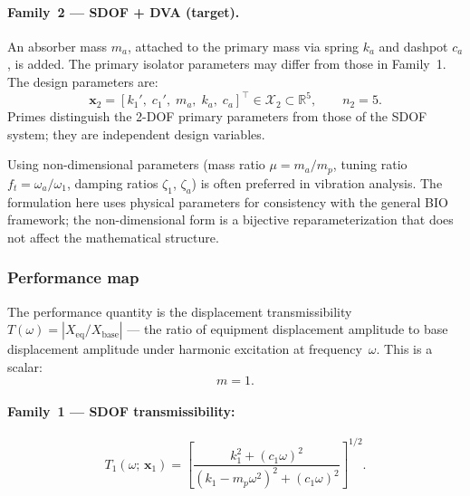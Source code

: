 \paragraph{Family~2 --- SDOF + DVA (target).}
An absorber mass $m_a$, attached to the primary mass via spring $k_a$ and dashpot $c_a$, is added. The primary isolator parameters may differ from those in Family~1. The design parameters are:
\begin{equation}
    \mathbf{x}_2 = [k_1',\; c_1',\; m_a,\; k_a,\; c_a]^\top \in \mathcal{X}_2 \subset \mathbb{R}^5, \qquad n_2 = 5.
    \label{eq:dva_params}
\end{equation}
Primes distinguish the 2-DOF primary parameters from those of the SDOF system; they are independent design variables.

\begin{remark}
Using non-dimensional parameters (mass ratio $\mu = m_a/m_p$, tuning ratio $f_t = \omega_a/\omega_1$, damping ratios $\zeta_1$, $\zeta_a$) is often preferred in vibration analysis. The formulation here uses physical parameters for consistency with the general BIO framework; the non-dimensional form is a bijective reparameterization that does not affect the mathematical structure.
\end{remark}


\subsubsection{Performance map}

The performance quantity is the displacement transmissibility $T(\omega) = |X_{\mathrm{eq}} / X_{\mathrm{base}}|$ --- the ratio of equipment displacement amplitude to base displacement amplitude under harmonic excitation at frequency~$\omega$. This is a scalar:
\begin{equation}
    m = 1.
\end{equation}

\paragraph{Family~1 --- SDOF transmissibility:}
\begin{equation}
    T_1(\omega;\, \mathbf{x}_1)
    = \left[ \frac{k_1^2 + (c_1 \omega)^2}{(k_1 - m_p \omega^2)^2 + (c_1 \omega)^2} \right]^{1/2}.
    \label{eq:sdof_transmissibility}
\end{equation}

